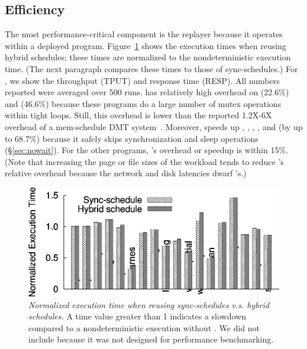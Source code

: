 \subsection{Efficiency} \label{sec:efficient}


  The most performance-critical component is the
replayer because it operates within a deployed program.
Figure~\ref{fig:overhead} shows the execution times when reusing hybrid
schedules; these times are normalized to the nondeterministic
execution time.  (The next paragraph compares these times to those of
sync-schedules.)  For \apache, we show the throughput (TPUT) and response
time (RESP).  All numbers reported were averaged over 500 runs.  \peregrine
has relatively high overhead on \watern (22.6\%) and \cholesky (46.6\%)
because these programs do a large number of mutex operations within tight loops.
Still, this overhead is
lower than the reported 1.2X-6X overhead of a mem-schedule DMT
system~\cite{coredet:asplos10}.  Moreover, \peregrine speeds up \barnes, \lun,
\radix, \waters, and \ocean (by up to 68.7\%) because it safely skips
synchronization and sleep operations (\S\ref{sec:nowait}).  For the other
programs, \peregrine's overhead or speedup is within 15\%.  (Note that
increasing the page or file sizes of the workload
tends to reduce \peregrine's relative overhead
because the network and disk latencies dwarf \peregrine's.)

\begin{figure}[t]
\centering
\includegraphics[width=\columnwidth]{peregrine/figures/overhead.eps}
\vspace{-.3in}
\caption{{\em Normalized execution time when reusing sync-schedules
    v.s. hybrid schedules.}  A time value greater than 1
  indicates a slowdown compared to a nondeterministic execution without
  \peregrine.  We did not include \racey because it was not designed for
  performance benchmarking. } \label{fig:overhead}
\end{figure}

